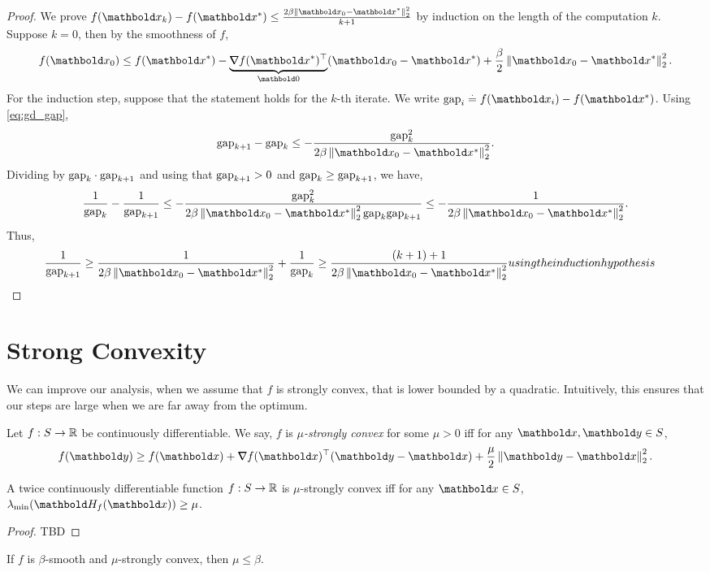 \begin{proof} We prove $f(\vx_k) - f(\s{\vx}) \leq \frac{2\beta\norm{\vx_0 - \s{\vx}}_2^2}{k+1}$ by induction on the length of the computation $k$. Suppose $k = 0$, then by the smoothness of $f$, \begin{align*}
    f(\vx_0) \leq f(\s{\vx}) - \underbrace{\trans{\grad f(\s{\vx})}}_{\vZero}(\vx_0 - \s{\vx}) + \frac{\beta}{2}\norm{\vx_0 - \s{\vx}}_2^2.
\end{align*} For the induction step, suppose that the statement holds for the $k$-th iterate. We write $\dgap_i \defeq f(\vx_i) - f(\s{\vx})$. Using \cref{eq:gd_gap}, \begin{align*}
    \dgap_{k+1} - \dgap_k \leq -\frac{\dgap_k^2}{2\beta\norm{\vx_0 - \s{\vx}}_2^2}.
\end{align*} Dividing by $\mathrm{gap}_k \cdot \mathrm{gap}_{k+1}$ and using that $\mathrm{gap}_{k+1} > 0$ and $\mathrm{gap}_k \geq \mathrm{gap}_{k+1}$, we have, \begin{align*}
    \frac{1}{\dgap_k} - \frac{1}{\dgap_{k+1}} \leq -\frac{\dgap_k^2}{2\beta\norm{\vx_0 - \s{\vx}}_2^2 \dgap_k \dgap_{k+1}} \leq -\frac{1}{2\beta\norm{\vx_0 - \s{\vx}}_2^2}.
\end{align*} Thus, \begin{align*}
    \frac{1}{\dgap_{k+1}} \geq \frac{1}{2\beta\norm{\vx_0 - \s{\vx}}_2^2} + \frac{1}{\dgap_k} \geq \frac{(k+1) + 1}{2\beta\norm{\vx_0 - \s{\vx}}_2^2} \margintag{using the induction hypothesis} &\qedhere
\end{align*}
\end{proof}

\section{Strong Convexity}

We can improve our analysis, when we assume that $f$ is strongly convex, that is lower bounded by a quadratic. Intuitively, this ensures that our steps are large when we are far away from the optimum.

\begin{defn} Let $f: S \to \mathbb{R}$ be continuously differentiable. We say, $f$ is \emph{$\mu$-strongly convex} for some $\mu > 0$ iff for any $\vx,\vy \in \sS$, \begin{align}
    f(\vy) \geq f(\vx) + \trans{\grad f(\vx)}(\vy - \vx) + \frac{\mu}{2}\norm{\vy - \vx}_2^2.
\end{align}
\end{defn}
\begin{lem}
A twice continuously differentiable function $f: S \to \mathbb{R}$ is $\mu$-strongly convex iff for any $\vx \in \sS$, $\lambda_{\min}(\mH_f(\vx)) \geq \mu$.
\end{lem}
\begin{proof}
TBD
\end{proof}
\begin{cor}
If $f$ is $\beta$-smooth and $\mu$-strongly convex, then $\mu \leq \beta$.
\end{cor}

